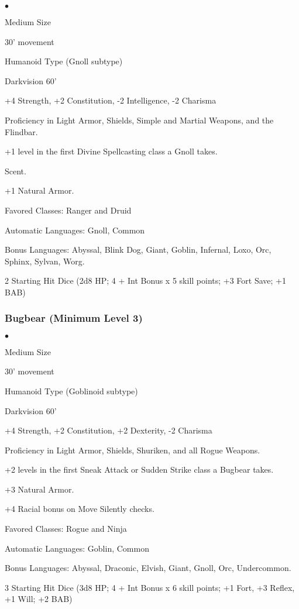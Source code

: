 \begin{list}{$\bullet$}{\itemspace}
    \item Medium Size
    \item 30' movement
    \item Humanoid Type (Gnoll subtype)
    \item Darkvision 60'
    \item +4 Strength, +2 Constitution, -2 Intelligence, -2 Charisma
    \item Proficiency in Light Armor, Shields, Simple and Martial Weapons, and the Flindbar.
    \item +1 level in the first Divine Spellcasting class a Gnoll takes.
    \item Scent.
    \item +1 Natural Armor.
    \item Favored Classes: Ranger and Druid
    \item Automatic Languages: Gnoll, Common
    \item Bonus Languages: Abyssal, Blink Dog, Giant, Goblin, Infernal, Loxo, Orc, Sphinx, Sylvan, Worg.
    \item 2 Starting Hit Dice (2d8 HP; 4 + Int Bonus x 5 skill points; +3 Fort Save; +1 BAB)
\end{list}

\subsubsection{Bugbear (Minimum Level 3)}

\begin{list}{$\bullet$}{\itemspace}
    \item Medium Size
    \item 30' movement
    \item Humanoid Type (Goblinoid subtype)
    \item Darkvision 60'
    \item +4 Strength, +2 Constitution, +2 Dexterity, -2 Charisma
    \item Proficiency in Light Armor, Shields, Shuriken, and all Rogue Weapons.
    \item +2 levels in the first Sneak Attack or Sudden Strike class a Bugbear takes.
    \item +3 Natural Armor.
    \item +4 Racial bonus on Move Silently checks.
    \item Favored Classes: Rogue and Ninja
    \item Automatic Languages: Goblin, Common
    \item Bonus Languages: Abyssal, Draconic, Elvish, Giant, Gnoll, Orc, Undercommon.
    \item 3 Starting Hit Dice (3d8 HP; 4 + Int Bonus x 6 skill points; +1 Fort, +3 Reflex, +1 Will; +2 BAB)
\end{list}

